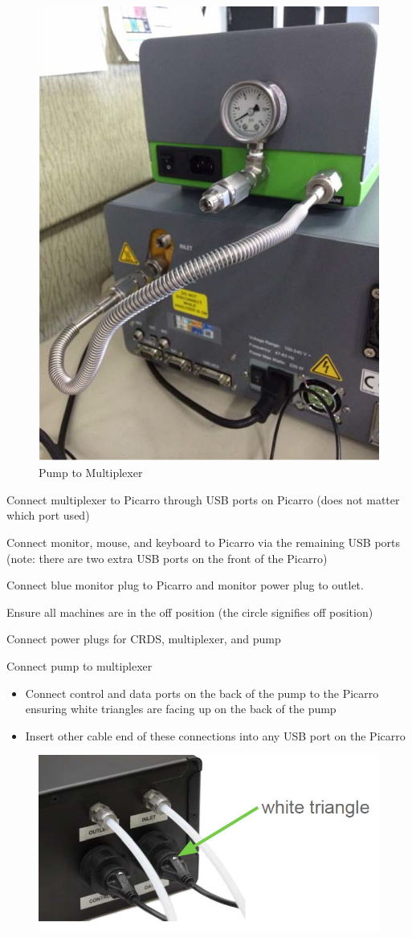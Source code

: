 \documentclass[12pt]{../SOP3}\usepackage[]{graphicx}\usepackage[]{color}
\begin{document}
\begin{figure}[h]
\includegraphics[width=.5\textwidth]{"graphics/pump_multiplexer"}
\caption{Pump to Multiplexer}
\end{figure}


\NP Connect multiplexer to Picarro through USB ports on Picarro (does not matter which port used)

\NP Connect monitor, mouse, and keyboard to Picarro via the remaining USB ports (note: there are two extra USB ports on the front of the Picarro)

\NP Connect blue monitor plug to Picarro and monitor power plug to outlet.

\NP Ensure all machines are in the off position (the circle signifies off position)

\NP Connect power plugs for CRDS, multiplexer, and pump

\NP Connect pump to multiplexer
\begin{itemize}
\item Connect control and data ports on the back of the pump to the Picarro ensuring white triangles are facing up on the back of the pump
\item Insert other cable end of these connections into any USB port on the Picarro
\end{itemize}

\begin{figure} 
\includegraphics[width=.5\textwidth]{"graphics/whitetriangleusb"}
\end{figure}
\end{document}
